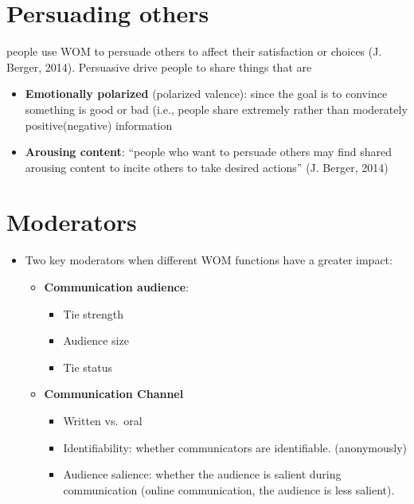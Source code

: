 \documentclass[
]{book}
\providecommand{\tightlist}{%
  \setlength{\itemsep}{0pt}\setlength{\parskip}{0pt}}
\begin{document}
\hypertarget{persuading-others}{%
\section{Persuading others}\label{persuading-others}}

people use WOM to persuade others to affect their satisfaction or choices (J. Berger, 2014). Persuasive drive people to share things that are

\begin{itemize}
\tightlist
\item
  \textbf{Emotionally polarized} (polarized valence): since the goal is to convince something is good or bad (i.e., people share extremely rather than moderately positive(negative) information\\
\item
  \textbf{Arousing content}: ``people who want to persuade others may find shared arousing content to incite others to take desired actions'' (J. Berger, 2014)
\end{itemize}

\hypertarget{moderators}{%
\section{Moderators}\label{moderators}}

\begin{itemize}
\tightlist
\item
  Two key moderators when different WOM functions have a greater impact:

  \begin{itemize}
  \tightlist
  \item
    \textbf{Communication audience}:

    \begin{itemize}
    \tightlist
    \item
      Tie strength
    \item
      Audience size
    \item
      Tie status
    \end{itemize}
  \item
    \textbf{Communication Channel}

    \begin{itemize}
    \tightlist
    \item
      Written vs.~oral
    \item
      Identifiability: whether communicators are identifiable. (anonymously)\\
    \item
      Audience salience: whether the audience is salient during communication (online communication, the audience is less salient).
    \end{itemize}
  \end{itemize}
\end{itemize}
\end{document}
